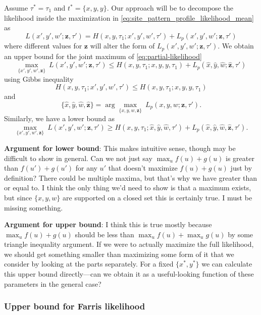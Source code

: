 \documentclass[a4paper]{article}
\begin{document}
Assume $\tau^*=\tau_1$ and $t^*=\{x,y,y\}$.
Our approach will be to decompose the likelihood inside the maximization in \eqref{eq:site_pattern_profile_likelihood_mean} as
\begin{equation}
\label{eq:partial-likelihood}
L(x', y', w'; \mathbf{z},\tau') = H(x,y,\tau_1;x',y',w', \tau') + L_{p}(x',y',w';\mathbf{z},\tau')
\end{equation}
where different values for $\mathbf{z}$ will alter the form of $L_{p}(x',y',w';\mathbf{z},\tau')$.
We obtain an upper bound for the joint maximum of \eqref{eq:partial-likelihood}
$$
\max_{\{x',y',w',\mathbf{z}\}} \ L(x',y',w';\mathbf{z},\tau') \le H(x,y,\tau_1;x,y,y,\tau_1) + L_{p}(\hat{x}, \hat{y}, \hat{w};\hat{\mathbf{z}},\tau')
$$
using Gibbs inequality
$$
H(x, y, \tau_1;x', y', w', \tau') \le H(x, y, \tau_1;x, y, y, \tau_1)
$$
and
$$
\{\hat{x}, \hat{y}, \hat{w}, \hat{\mathbf{z}}\} = \arg\max_{\{x,y,w,\mathbf{z}\}} \ L_{p}(x,y,w;\mathbf{z},\tau').
$$
Similarly, we have a lower bound as
$$
\max_{\{x',y',w',\mathbf{z}\}} \ L(x',y',w';\mathbf{z},\tau') \ge H(x,y,\tau_1; \hat{x}, \hat{y}, \hat{w}, \tau') + L_{p}(\hat{x}, \hat{y}, \hat{w},\hat{\mathbf{z}},\tau').
$$

\textbf{Argument for lower bound}: This makes intuitive sense, though may be difficult to show in general.
Can we not just say $\max_u f(u) + g(u)$ is greater than $f(u') + g(u')$ for any $u'$ that doesn't maximize $f(u) + g(u)$ just by definition?
There could be multiple maxima, but that's why we have greater than or equal to.
I think the only thing we'd need to show is that a maximum exists, but since $\{x,y,w\}$ are supported on a closed set this is certainly true.
I must be missing something.

\textbf{Argument for upper bound}: I think this is true mostly because $\max_u f(u) + g(u)$ should be less than $\max_u f(u) + \max_u g(u)$ by some triangle inequality argument.
If we were to actually maximize the full likelihood, we should get something smaller than maximizing some form of it that we consider by looking at the parts separately.
For a fixed $\{x^*, y^*\}$ we can calculate this upper bound directly---can we obtain it as a useful-looking function of these parameters in the general case?

\subsubsection{Upper bound for Farris likelihood}
\end{document}
